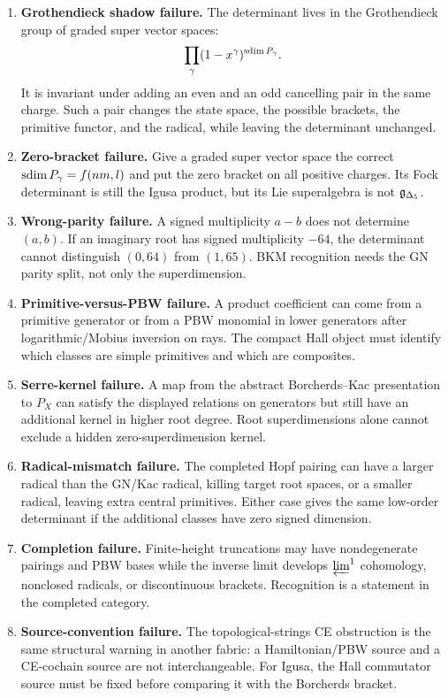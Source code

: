 \begin{enumerate}
\item \textbf{Grothendieck shadow failure.}  The determinant lives in
the Grothendieck group of graded super vector spaces:
\[
   \prod_\gamma (1-x^\gamma)^{\operatorname{sdim} P_\gamma}.
\]
It is invariant under adding an even and an odd cancelling pair in the
same charge.  Such a pair changes the state space, the possible
brackets, the primitive functor, and the radical, while leaving the
determinant unchanged.

\item \textbf{Zero-bracket failure.}  Give a graded super vector space
the correct \(\operatorname{sdim} P_\gamma=f(nm,l)\) and put the zero bracket on all
positive charges.  Its Fock determinant is still the Igusa product, but
its Lie superalgebra is not \(\mathfrak g_{\Delta_5}\).

\item \textbf{Wrong-parity failure.}  A signed multiplicity \(a-b\)
does not determine \((a,b)\).  If an imaginary root has signed
multiplicity \(-64\), the determinant cannot distinguish
\((0,64)\) from \((1,65)\).  BKM recognition needs the GN parity split,
not only the superdimension.

\item \textbf{Primitive-versus-PBW failure.}  A product coefficient can
come from a primitive generator or from a PBW monomial in lower
generators after logarithmic/Mobius inversion on rays.  The compact Hall
object must identify which classes are simple primitives and which are
composites.

\item \textbf{Serre-kernel failure.}  A map from the abstract
Borcherds--Kac presentation to \(P_X\) can satisfy the displayed
relations on generators but still have an additional kernel in higher
root degree.  Root superdimensions alone cannot exclude a hidden
zero-superdimension kernel.

\item \textbf{Radical-mismatch failure.}  The completed Hopf pairing can
have a larger radical than the GN/Kac radical, killing target root
spaces, or a smaller radical, leaving extra central primitives.  Either
case gives the same low-order determinant if the additional classes have
zero signed dimension.

\item \textbf{Completion failure.}  Finite-height truncations may have
nondegenerate pairings and PBW bases while the inverse limit develops
\(\varprojlim^1\) cohomology, nonclosed radicals, or discontinuous
brackets.  Recognition is a statement in the completed category.

\item \textbf{Source-convention failure.}  The topological-strings CE
obstruction is the same structural warning in another fabric: a
Hamiltonian/PBW source and a CE-cochain source are not interchangeable.
For Igusa, the Hall commutator source must be fixed before comparing it
with the Borcherds bracket.
\end{enumerate}

